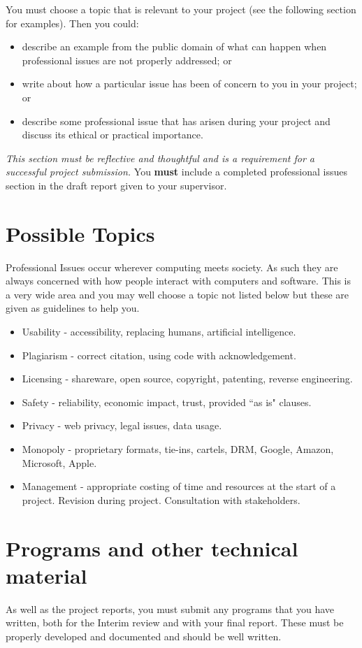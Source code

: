 \documentclass[11pt]{article}
\begin{document}
You must choose a topic that is relevant to your project (see the following section for examples).  Then you could:
\begin{itemize}
\item describe an example from the public domain of what can happen when professional issues are not properly addressed; or
\item write about how a particular issue has been of concern to you in your project; or
\item describe some professional issue that has arisen during your project and discuss its ethical or practical importance.
\end{itemize}

\textit{This section must be reflective and thoughtful and is a requirement for a successful project submission.}  You \textbf{must} include a completed professional issues section in the draft report given to your supervisor.

\section*{Possible Topics}
Professional Issues occur wherever computing meets society.  As such they are always concerned with how people interact with computers and software.  This is a very wide area and you may well choose a topic not listed below but these are given as guidelines to help you.
\begin{itemize}
\item Usability - accessibility, replacing humans, artificial intelligence.
\item Plagiarism - correct citation, using code with acknowledgement.
\item Licensing - shareware, open source, copyright, patenting, reverse engineering.
\item Safety - reliability, economic impact, trust, provided ``as is" clauses.
\item Privacy - web privacy, legal issues, data usage.
\item Monopoly - proprietary formats, tie-ins, cartels, DRM, Google, Amazon, Microsoft, Apple.
\item Management - appropriate costing of time and resources at the start of a project. Revision during project. Consultation with stakeholders.
\end{itemize}

\newpage
\section{Programs and other technical material}
As well as the project reports, you must submit any programs that you have written, both for the Interim review and with your final report.  These must be properly developed and documented and should be well written.
\end{document}
